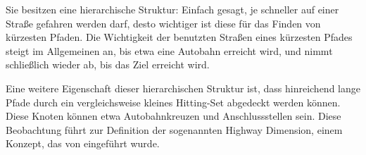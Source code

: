 Sie besitzen eine hierarchische Struktur: Einfach gesagt, je schneller auf einer Straße gefahren werden darf, desto wichtiger ist diese für das Finden von kürzesten Pfaden. Die Wichtigkeit der benutzten Straßen eines kürzesten Pfades steigt im Allgemeinen an, bis etwa eine Autobahn erreicht wird, und nimmt schließlich wieder ab, bis das Ziel erreicht wird.

Eine weitere Eigenschaft dieser hierarchischen Struktur ist, dass hinreichend lange Pfade durch ein vergleichsweise kleines Hitting-Set abgedeckt werden können. Diese Knoten können etwa Autobahnkreuzen und Anschlussstellen sein. Diese Beobachtung führt zur Definition der sogenannten Highway Dimension, einem Konzept, das von \cite{abraham2010highway} eingeführt wurde.

% 
% 
% 
% 
% 
% 
